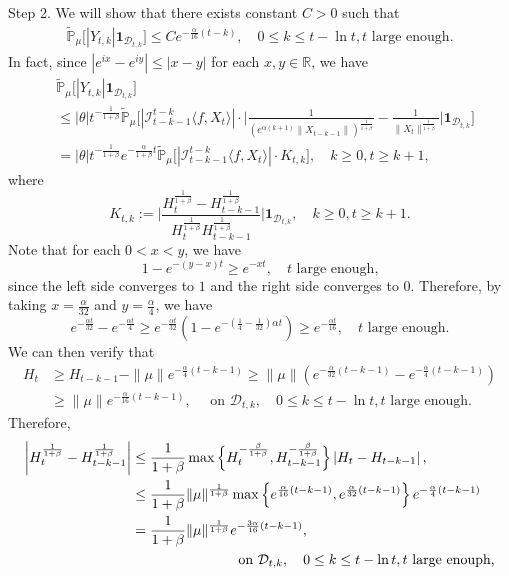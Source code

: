 \documentclass[12pt]{amsart}
\theoremstyle{plain}
\theoremstyle{definition}
\numberwithin{equation}{section}
\begin{document}
    Step 2. We will show that there exists constant $C > 0$ such that
\begin{align}
\label{thm122}
     \mathbb{\tilde{P}}_{\mu}\big[|Y_{t,k}|\mathbf{1}_{\mathcal{D}_{t,k}}\big]
     \leq  C e^{-\frac{\alpha}{16}(t-k)}, \quad 0\leq k\leq t-\ln t, t\text{ large enough.}
\end{align}
    In fact, since $|e^{ix}-e^{iy}|\leq|x-y|$ for each $x,y\in \mathbb R$, we have
\begin{align}
\label{eq: control of Ykt}
        &\mathbb{\tilde{P}}_{\mu}\big[|Y_{t,k}|\mathbf{1}_{\mathcal{D}_{t,k}}\big]
        \\&\leq|\theta|t^{-\frac{1}{1+\beta}} \mathbb{\tilde{P}}_{\mu}\bigg[|\mathcal I_{t-k-1}^{t-k}\langle f ,X_t\rangle|\cdot\Big|\frac{1}{(e^{\alpha(k+1)}\|X_{t-k-1}\|)^{\frac{1}{1+\beta}}}-\frac{1}{\|X_t\|^{\frac{1}{1+\beta}}}\Big|\mathbf{1}_{\mathcal{D}_{t,k}}\bigg]
        \\&=|\theta|t^{-\frac{1}{1+\beta}}e^{-\frac{\alpha}{1+\beta}t}\mathbb{\tilde{P}}_{\mu}\big[|\mathcal I_{t-k-1}^{t-k}\langle f ,X_t\rangle|\cdot K_{t,k}\big],
        \quad k\geq 0, t\geq k+1,
\end{align}
    where
\begin{equation}
\label{def: Ktk}
    K_{t,k}
    :=\Big|\frac{H_t^{\frac{1}{1+\beta}}-H_{t-k-1}^{\frac{1}{1+\beta}}}{H_t^{\frac{1}{1+\beta}}H_{t-k-1}^{\frac{1}{1+\beta}}}\Big|\mathbf{1}_{\mathcal{D}_{t,k}},
    \quad k\geq 0, t\geq k+1.
\end{equation}
    Note that for each $0 < x< y$, we have
\[
    1-e^{-(y-x)t} 
    \geq e^{-xt},
    \quad t \text{ large enough,}
\]
    since the left side converges to $1$ and the right side converges to $0$.
    Therefore, by taking $x= \frac{\alpha}{32}$ and $y= \frac{\alpha}{4}$, we have 
\[
    e^{-\frac{\alpha t}{32} } - e^{-\frac{\alpha t}{4}}
    \geq e^{- \frac{\alpha t}{32}}(1 - e^{-(\frac{1}{4} - \frac{1}{32})\alpha t})
    \geq e^{- \frac{\alpha t}{16}},
    \quad t \text{ large enough.}
\]
    We can then verify that
\begin{align*}
    H_t
    &\geq H_{t-k-1}-\|\mu\| e^{-\frac{\alpha}{4}(t-k-1)}
    \geq\|\mu\|\left(e^{-\frac{\alpha}{32}(t-k-1)}-e^{-\frac{\alpha}{4}(t-k-1)}\right)
    \\&\geq \|\mu\| e^{-\frac{\alpha}{16}(t-k-1)},
    \quad \text{ on } \mathcal D_{t,k}, 
    \quad 0 \leq k \leq t - \ln t, t \text{ large enough}.
\end{align*}
    Therefore,
\begin{align*}
     \left|H_t^{\frac{1}{1+\beta}}-H_{t-k-1}^{\frac{1}{1+\beta}}\right|
     &\leq \frac{1}{1+\beta}\max \Big\{H_t^{-\frac{\beta}{1+\beta}},H_{t-k-1}^{-\frac{\beta}{1+\beta}}\Big\}\left|H_t-H_{t-k-1}\right|,
    \\&\leq \frac{1}{1+\beta}\|\mu\|^{\frac{1}{1+\beta}} \max\left\{e^{\frac{\alpha}{16}(t-k-1)}, e^{\frac{\alpha}{32}(t-k-1)}\right\}e^{-\frac{\alpha}{4}(t-k-1)}\\
    &=\frac{1}{1+\beta}\|\mu\|^{\frac{1}{1+\beta}}  e^{-\frac{3\alpha}{16}(t-k-1)},
    \\ && \mathllap{ \text{ on } \mathcal D_{t,k}, \quad 0 \leq k \leq t - \ln t, t \text{ large enouph,} }
\end{align*}
\end{document}
